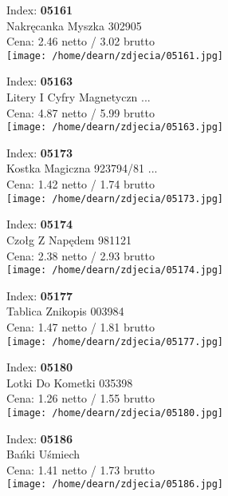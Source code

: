 {Index: \textbf{05161}\\
Nakręcanka Myszka 302905\\
Cena: 2.46 netto / 3.02 brutto\\
  \texttt{[image: /home/dearn/zdjecia/05161.jpg]}}\newline\newline

{Index: \textbf{05163}\\
Litery I Cyfry Magnetyczn ...\\
Cena: 4.87 netto / 5.99 brutto\\
  \texttt{[image: /home/dearn/zdjecia/05163.jpg]}}\newline\newline

{Index: \textbf{05173}\\
Kostka Magiczna 923794/81 ...\\
Cena: 1.42 netto / 1.74 brutto\\
  \texttt{[image: /home/dearn/zdjecia/05173.jpg]}}\newline\newline

{Index: \textbf{05174}\\
Czołg Z Napędem 981121\\
Cena: 2.38 netto / 2.93 brutto\\
  \texttt{[image: /home/dearn/zdjecia/05174.jpg]}}\newline\newline

{Index: \textbf{05177}\\
Tablica Znikopis 003984\\
Cena: 1.47 netto / 1.81 brutto\\
  \texttt{[image: /home/dearn/zdjecia/05177.jpg]}}\newline\newline

{Index: \textbf{05180}\\
Lotki Do Kometki 035398\\
Cena: 1.26 netto / 1.55 brutto\\
  \texttt{[image: /home/dearn/zdjecia/05180.jpg]}}\newline\newline

{Index: \textbf{05186}\\
Bańki Uśmiech \\
Cena: 1.41 netto / 1.73 brutto\\
  \texttt{[image: /home/dearn/zdjecia/05186.jpg]}}\newline\newline

